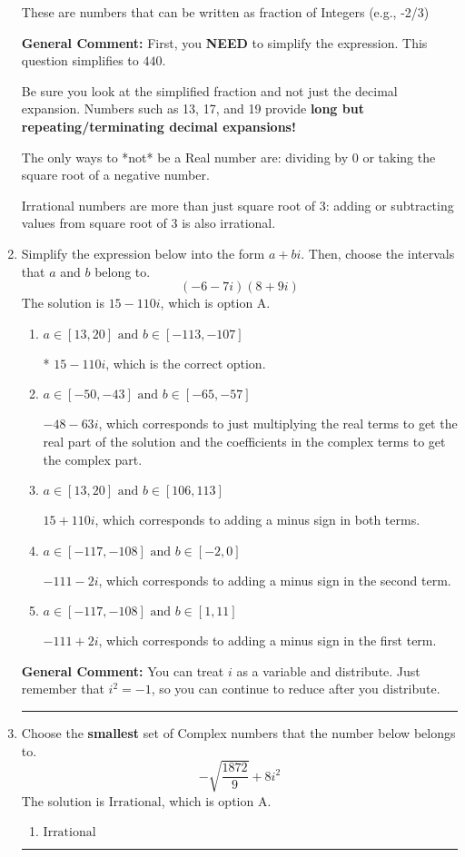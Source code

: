 \documentclass{extbook}[14pt]
\newcommand{\litem}[1]{\item #1

\rule{\textwidth}{0.4pt}}
\begin{document}
\begin{enumerate}
{\begin{enumerate}[label=\Alph*.]
These are numbers that can be written as fraction of Integers (e.g., -2/3)
\end{enumerate}

\textbf{General Comment:} First, you \textbf{NEED} to simplify the expression. This question simplifies to $440$. 
 
 Be sure you look at the simplified fraction and not just the decimal expansion. Numbers such as 13, 17, and 19 provide \textbf{long but repeating/terminating decimal expansions!} 
 
 The only ways to *not* be a Real number are: dividing by 0 or taking the square root of a negative number. 
 
 Irrational numbers are more than just square root of 3: adding or subtracting values from square root of 3 is also irrational.
}
\litem{
Simplify the expression below into the form $a+bi$. Then, choose the intervals that $a$ and $b$ belong to.
\[ (-6 - 7 i)(8 + 9 i) \]
The solution is \( 15 - 110 i \), which is option A.\begin{enumerate}[label=\Alph*.]
\item \( a \in [13, 20] \text{ and } b \in [-113, -107] \)

* $15 - 110 i$, which is the correct option.
\item \( a \in [-50, -43] \text{ and } b \in [-65, -57] \)

 $-48 - 63 i$, which corresponds to just multiplying the real terms to get the real part of the solution and the coefficients in the complex terms to get the complex part.
\item \( a \in [13, 20] \text{ and } b \in [106, 113] \)

 $15 + 110 i$, which corresponds to adding a minus sign in both terms.
\item \( a \in [-117, -108] \text{ and } b \in [-2, 0] \)

 $-111 - 2 i$, which corresponds to adding a minus sign in the second term.
\item \( a \in [-117, -108] \text{ and } b \in [1, 11] \)

 $-111 + 2 i$, which corresponds to adding a minus sign in the first term.
\end{enumerate}

\textbf{General Comment:} You can treat $i$ as a variable and distribute. Just remember that $i^2=-1$, so you can continue to reduce after you distribute.
}
\litem{
Choose the \textbf{smallest} set of Complex numbers that the number below belongs to.
\[ -\sqrt{\frac{1872}{9}}+8i^2 \]
The solution is \( \text{Irrational} \), which is option A.\begin{enumerate}[label=\Alph*.]
\item \( \text{Irrational} \)


\end{enumerate}}
\end{enumerate}
\end{document}
